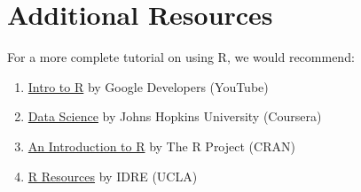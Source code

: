 \section{Additional Resources}
For a more complete tutorial on using R, we would recommend:
\begin{enumerate}
	\item \href{https://www.youtube.com/playlist?list=PLOU2XLYxmsIK9qQfztXeybpHvru-TrqAP}{Intro to R} by Google Developers (YouTube)
	\item \href{https://www.coursera.org/specialization/jhudatascience/1/courses}{Data Science} by Johns Hopkins University (Coursera)
	\item \href{http://cran.r-project.org/doc/manuals/R-intro.html}{An Introduction to R} by The R Project (CRAN)
	\item \href{http://statistics.ats.ucla.edu/stat/r/}{R Resources} by IDRE (UCLA)
\end{enumerate}